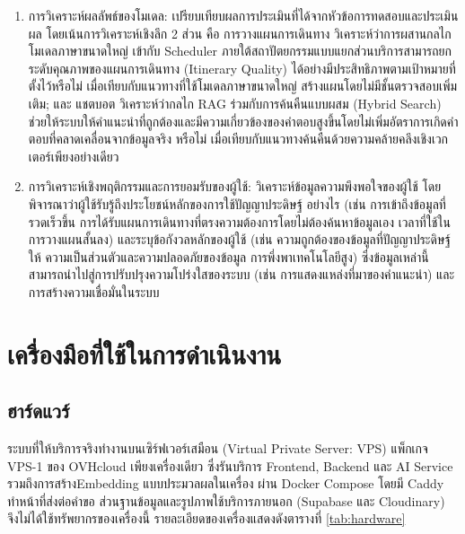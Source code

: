 \begin{enumerate}
\item การวิเคราะห์ผลลัพธ์ของโมเดล: เปรียบเทียบผลการประเมินที่ได้จากหัวข้อการทดสอบและประเมินผล โดยเน้นการวิเคราะห์เชิงลึก 2 ส่วน คือ การวางแผนการเดินทาง วิเคราะห์ว่าการผสานกลไกโมเดลภาษาขนาดใหญ่ เข้ากับ Scheduler ภายใต้สถาปัตยกรรมแบบแยกส่วนบริการสามารถยกระดับคุณภาพของแผนการเดินทาง (Itinerary Quality) ได้อย่างมีประสิทธิภาพตามเป้าหมายที่ตั้งไว้หรือไม่ เมื่อเทียบกับแนวทางที่ใช้โมเดลภาษาขนาดใหญ่ สร้างแผนโดยไม่มีชั้นตรวจสอบเพิ่มเติม; และ แชตบอต วิเคราะห์ว่ากลไก RAG ร่วมกับการค้นคืนแบบผสม (Hybrid Search) ช่วยให้ระบบให้คำแนะนำที่ถูกต้องและมีความเกี่ยวข้องของคำตอบสูงขึ้นโดยไม่เพิ่มอัตราการเกิดคำตอบที่คลาดเคลื่อนจากข้อมูลจริง หรือไม่ เมื่อเทียบกับแนวทางค้นคืนด้วยความคล้ายคลึงเชิงเวกเตอร์เพียงอย่างเดียว

\item การวิเคราะห์เชิงพฤติกรรมและการยอมรับของผู้ใช้: วิเคราะห์ข้อมูลความพึงพอใจของผู้ใช้ โดยพิจารณาว่าผู้ใช้รับรู้ถึงประโยชน์หลักของการใช้ปัญญาประดิษฐ์ อย่างไร (เช่น การเข้าถึงข้อมูลที่รวดเร็วขึ้น การได้รับแผนการเดินทางที่ตรงความต้องการโดยไม่ต้องค้นหาข้อมูลเอง เวลาที่ใช้ในการวางแผนสั้นลง) และระบุข้อกังวลหลักของผู้ใช้ (เช่น ความถูกต้องของข้อมูลที่ปัญญาประดิษฐ์ ให้ ความเป็นส่วนตัวและความปลอดภัยของข้อมูล การพึ่งพาเทคโนโลยีสูง) ซึ่งข้อมูลเหล่านี้สามารถนำไปสู่การปรับปรุงความโปร่งใสของระบบ (เช่น การแสดงแหล่งที่มาของคำแนะนำ) และการสร้างความเชื่อมั่นในระบบ
\end{enumerate}

\section{เครื่องมือที่ใช้ในการดำเนินงาน}


\subsection{ฮาร์ดแวร์}

ระบบที่ให้บริการจริงทำงานบนเซิร์ฟเวอร์เสมือน (Virtual Private Server: VPS) แพ็กเกจ VPS-1 ของ OVHcloud เพียงเครื่องเดียว ซึ่งรันบริการ Frontend, Backend และ AI Service รวมถึงการสร้างEmbedding แบบประมวลผลในเครื่อง ผ่าน Docker Compose โดยมี Caddy ทำหน้าที่ส่งต่อคำขอ ส่วนฐานข้อมูลและรูปภาพใช้บริการภายนอก (Supabase และ Cloudinary) จึงไม่ได้ใช้ทรัพยากรของเครื่องนี้ รายละเอียดของเครื่องแสดงดังตารางที่ \ref{tab:hardware}

